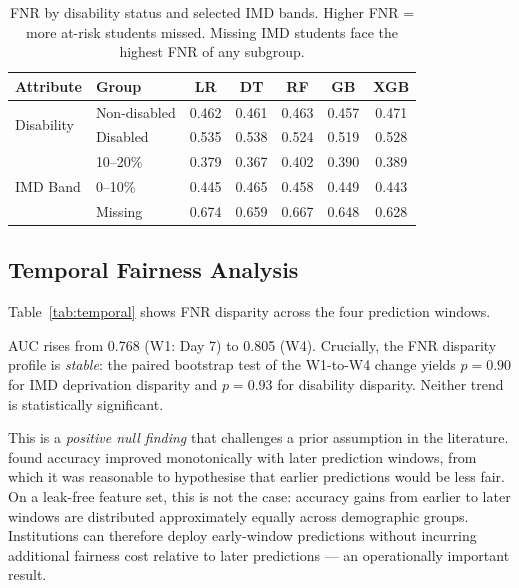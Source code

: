 \documentclass[12pt,a4paper]{article}
\begin{document}
\begin{table}[ht]
\centering
\caption{FNR by disability status and selected IMD bands. Higher FNR = more
at-risk students missed. Missing IMD students face the highest FNR of any
subgroup.}
\label{tab:fnr_baseline}
\small
\begin{tabular}{llccccc}
\toprule
Attribute & Group & LR & DT & RF & GB & XGB \\
\midrule
\multirow{2}{*}{Disability}
  & Non-disabled & 0.462 & 0.461 & 0.463 & 0.457 & 0.471 \\
  & Disabled     & 0.535 & 0.538 & 0.524 & 0.519 & 0.528 \\
\midrule
\multirow{3}{*}{IMD Band}
  & 10--20\%     & 0.379 & 0.367 & 0.402 & 0.390 & 0.389 \\
  & 0--10\%      & 0.445 & 0.465 & 0.458 & 0.449 & 0.443 \\
  & Missing      & 0.674 & 0.659 & 0.667 & 0.648 & 0.628 \\
\bottomrule
\end{tabular}
\end{table}

\subsection{Temporal Fairness Analysis}

Table~\ref{tab:temporal} shows FNR disparity across the four prediction windows.

AUC rises from 0.768 (W1: Day 7) to 0.805 (W4). Crucially, the FNR disparity
profile is \textit{stable}: the paired bootstrap test of the W1-to-W4 change
yields $p = 0.90$ for IMD deprivation disparity and $p = 0.93$ for disability
disparity. Neither trend is statistically significant.

This is a \textit{positive null finding} that challenges a prior assumption in
the literature. \citet{idowu2024} found accuracy improved monotonically with
later prediction windows, from which it was reasonable to hypothesise that
earlier predictions would be less fair. On a leak-free feature set, this is
not the case: accuracy gains from earlier to later windows are distributed
approximately equally across demographic groups. Institutions can therefore
deploy early-window predictions without incurring additional fairness cost
relative to later predictions --- an operationally important result.
\end{document}
